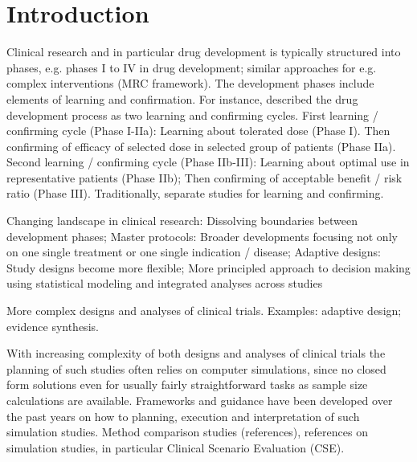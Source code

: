 \documentclass[bimj,fleqn]{w-art}
\theoremstyle{plain}
\theoremstyle{definition}
\begin{document}
\maketitle                   %







\section{Introduction}

Clinical research and in particular drug development is typically structured into phases, e.g. phases I to IV in drug development; similar approaches for e.g. complex interventions (MRC framework). 
The development phases include elements of learning and confirmation. 
For instance, \cite{sheiner_learning_1997} described the drug development process as two learning and confirming cycles. 
First learning / confirming cycle (Phase I-IIa): Learning about tolerated dose (Phase I). 
Then confirming of efficacy of selected dose in selected group of patients (Phase IIa). 
Second learning / confirming cycle (Phase IIb-III): Learning about optimal use in representative patients (Phase IIb); Then confirming of acceptable benefit / risk ratio (Phase III). 
Traditionally, separate studies for learning and confirming.  

Changing landscape in clinical research: Dissolving boundaries between development phases; Master protocols: Broader developments focusing not only on one single treatment or one single indication / disease; Adaptive designs: Study designs become more flexible; More principled approach to decision making using statistical modeling and integrated analyses across studies

More complex designs and analyses of clinical trials. 
Examples: adaptive design; evidence synthesis.

With increasing complexity of both designs and analyses of clinical trials the planning of such studies often relies on computer simulations, since no closed form solutions even for usually fairly straightforward tasks as sample size calculations are available. 
Frameworks and guidance have been developed over the past years on how to planning, execution and interpretation of such simulation studies. 
Method comparison studies (references), references on simulation studies, in particular Clinical Scenario Evaluation (CSE).
\end{document}
